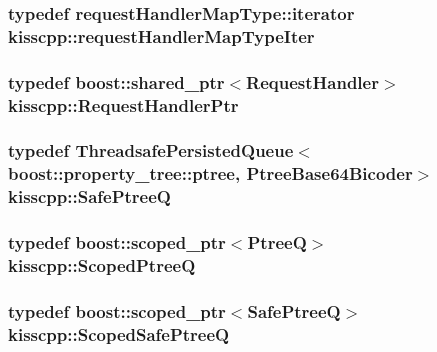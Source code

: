 \hypertarget{namespacekisscpp_acb02d872f8089cccfccea0cbf2191a76}{
\subsubsection[{request\-Handler\-Map\-Type\-Iter}]{\setlength{\rightskip}{0pt plus 5cm}typedef request\-Handler\-Map\-Type\-::iterator {\bf kisscpp\-::request\-Handler\-Map\-Type\-Iter}}}\label{namespacekisscpp_acb02d872f8089cccfccea0cbf2191a76}
\hypertarget{namespacekisscpp_a21e40edcd4f1a3c7c1cc0015b576c8e5}{
\subsubsection[{Request\-Handler\-Ptr}]{\setlength{\rightskip}{0pt plus 5cm}typedef boost\-::shared\-\_\-ptr$<${\bf Request\-Handler}$>$ {\bf kisscpp\-::\-Request\-Handler\-Ptr}}}\label{namespacekisscpp_a21e40edcd4f1a3c7c1cc0015b576c8e5}
\hypertarget{namespacekisscpp_ac48ab954f4898861f383b80e857e17cc}{
\subsubsection[{Safe\-Ptree\-Q}]{\setlength{\rightskip}{0pt plus 5cm}typedef {\bf Threadsafe\-Persisted\-Queue}$<$boost\-::property\-\_\-tree\-::ptree, {\bf Ptree\-Base64\-Bicoder}$>$ {\bf kisscpp\-::\-Safe\-Ptree\-Q}}}\label{namespacekisscpp_ac48ab954f4898861f383b80e857e17cc}
\hypertarget{namespacekisscpp_a64a7093fe1bdc3f323b469e800eebc7f}{
\subsubsection[{Scoped\-Ptree\-Q}]{\setlength{\rightskip}{0pt plus 5cm}typedef boost\-::scoped\-\_\-ptr$<${\bf Ptree\-Q}$>$ {\bf kisscpp\-::\-Scoped\-Ptree\-Q}}}\label{namespacekisscpp_a64a7093fe1bdc3f323b469e800eebc7f}
\hypertarget{namespacekisscpp_a20653e6629a85affc6a1b8529e0a8da0}{
\subsubsection[{Scoped\-Safe\-Ptree\-Q}]{\setlength{\rightskip}{0pt plus 5cm}typedef boost\-::scoped\-\_\-ptr$<${\bf Safe\-Ptree\-Q}$>$ {\bf kisscpp\-::\-Scoped\-Safe\-Ptree\-Q}}}\label{namespacekisscpp_a20653e6629a85affc6a1b8529e0a8da0}
